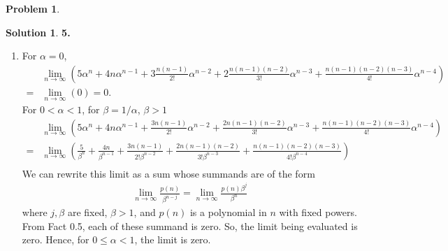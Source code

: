 \documentclass{article}
\theoremstyle{definition}
\newtheorem*{prob*}{Problem}
\newtheorem*{sln*}{Solution}
\begin{document}
\begin{prob*}
	\begin{sln*}\textbf{5. }
		\begin{enumerate}
			\item For $\alpha = 0$, 
			\begin{align*}
			&\lim\limits_{n\to \infty} \left(    5\alpha^n + 4n\alpha^{n-1} + 3\frac{n(n-1)}{2!}\alpha^{n-2} + 2\frac{n(n-1)(n-2)}{3!}\alpha^{n-3}  + \frac{n(n-1)(n-2)(n-3)}{4!}\alpha^{n-4} \right) \\
			= &\lim\limits_{n\to\infty}(0) = 0.
			\end{align*}
			For $0 < \alpha < 1$, for $\beta = 1/\alpha$, $\beta > 1$
			\begin{align*}
			&\lim\limits_{n\to \infty} \left(    5\alpha^n + 4n\alpha^{n-1} + \frac{3n(n-1)}{2!}\alpha^{n-2} + \frac{2n(n-1)(n-2)}{3!}\alpha^{n-3}  + \frac{n(n-1)(n-2)(n-3)}{4!}\alpha^{n-4} \right)\\
			= &\lim\limits_{n\to\infty}\left(    \frac{5}{\beta^n} + \frac{4n}{\beta^{n-1}} + \frac{3n(n-1)}{2!\beta^{n-2}} + \frac{2n(n-1)(n-2)}{3!\beta^{n-3}}  + \frac{n(n-1)(n-2)(n-3)}{4!\beta^{n-4}} \right) \\
			\end{align*}
			We can rewrite this limit as a sum whose summands are of the form
			\begin{align*}
			\lim\limits_{n\to\infty}\frac{p(n)}{\beta^{n-j}} = \lim\limits_{n\to\infty}\frac{p(n)\beta^{j}}{\beta^{n}}
			\end{align*}
			where $j, \beta$ are fixed, $\beta>1$, and $p(n)$ is a polynomial in $n$ with fixed powers. From Fact 0.5, each of these summand is zero. So, the limit being evaluated is zero. Hence, for $0\leq \alpha < 1$, the limit is zero. \\
			

\end{enumerate}
\end{sln*}
\end{prob*}
\end{document}
